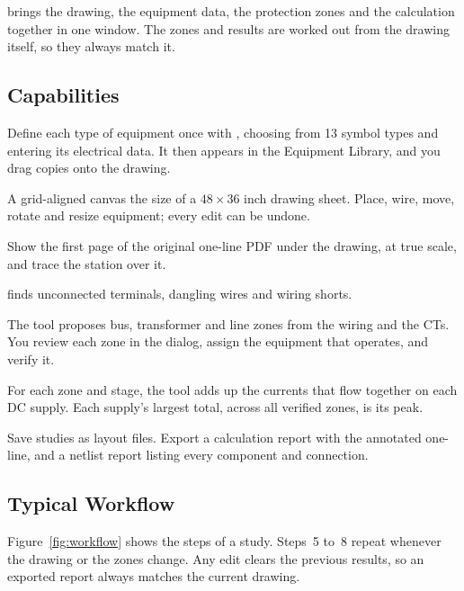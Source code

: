 \app{} brings the drawing, the equipment data, the protection zones and the
calculation together in one window. The zones and results are worked out from the
drawing itself, so they always match it.

\subsection{Capabilities}

\begin{description}[style=nextline, leftmargin=1.2em]
  \item[Equipment library]
    Define each type of equipment once with , choosing from 13
    symbol types and entering its electrical data. It then appears in the Equipment
    Library, and you drag copies onto the drawing.
  \item[Drawing workspace]
    A grid-aligned canvas the size of a $48 \times 36$ inch drawing sheet. Place, wire,
    move, rotate and resize equipment; every edit can be undone.
  \item[PDF background]
    Show the first page of the original one-line PDF under the drawing, at true scale,
    and trace the station over it.
  \item[Validation]
     finds unconnected terminals, dangling wires and wiring shorts.
  \item[Protection zones]
    The tool proposes bus, transformer and line zones from the wiring and the CTs. You
    review each zone in the  dialog, assign the equipment that
    operates, and verify it.
  \item[Momentary load calculation]
    For each zone and stage, the tool adds up the currents that flow together on each
    DC supply. Each supply's largest total, across all verified zones, is its peak.
  \item[Reports and files]
    Save studies as layout files. Export a calculation report with the annotated
    one-line, and a netlist report listing every component and connection.
\end{description}

\subsection{Typical Workflow}

Figure~\ref{fig:workflow} shows the steps of a study. Steps~5 to~8 repeat whenever the
drawing or the zones change. Any edit clears the previous results, so an exported
report always matches the current drawing.


